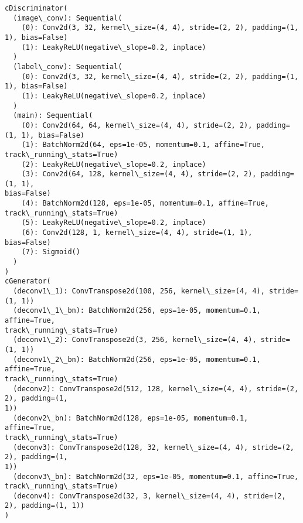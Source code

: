 \documentclass[11pt]{article}
\begin{document}
    \begin{Verbatim}[commandchars=\\\{\},fontsize=\footnotesize]
cDiscriminator(
  (image\_conv): Sequential(
    (0): Conv2d(3, 32, kernel\_size=(4, 4), stride=(2, 2), padding=(1, 1), bias=False)
    (1): LeakyReLU(negative\_slope=0.2, inplace)
  )
  (label\_conv): Sequential(
    (0): Conv2d(3, 32, kernel\_size=(4, 4), stride=(2, 2), padding=(1, 1), bias=False)
    (1): LeakyReLU(negative\_slope=0.2, inplace)
  )
  (main): Sequential(
    (0): Conv2d(64, 64, kernel\_size=(4, 4), stride=(2, 2), padding=(1, 1), bias=False)
    (1): BatchNorm2d(64, eps=1e-05, momentum=0.1, affine=True,
track\_running\_stats=True)
    (2): LeakyReLU(negative\_slope=0.2, inplace)
    (3): Conv2d(64, 128, kernel\_size=(4, 4), stride=(2, 2), padding=(1, 1),
bias=False)
    (4): BatchNorm2d(128, eps=1e-05, momentum=0.1, affine=True,
track\_running\_stats=True)
    (5): LeakyReLU(negative\_slope=0.2, inplace)
    (6): Conv2d(128, 1, kernel\_size=(4, 4), stride=(1, 1), bias=False)
    (7): Sigmoid()
  )
)
cGenerator(
  (deconv1\_1): ConvTranspose2d(100, 256, kernel\_size=(4, 4), stride=(1, 1))
  (deconv1\_1\_bn): BatchNorm2d(256, eps=1e-05, momentum=0.1, affine=True,
track\_running\_stats=True)
  (deconv1\_2): ConvTranspose2d(3, 256, kernel\_size=(4, 4), stride=(1, 1))
  (deconv1\_2\_bn): BatchNorm2d(256, eps=1e-05, momentum=0.1, affine=True,
track\_running\_stats=True)
  (deconv2): ConvTranspose2d(512, 128, kernel\_size=(4, 4), stride=(2, 2), padding=(1,
1))
  (deconv2\_bn): BatchNorm2d(128, eps=1e-05, momentum=0.1, affine=True,
track\_running\_stats=True)
  (deconv3): ConvTranspose2d(128, 32, kernel\_size=(4, 4), stride=(2, 2), padding=(1,
1))
  (deconv3\_bn): BatchNorm2d(32, eps=1e-05, momentum=0.1, affine=True,
track\_running\_stats=True)
  (deconv4): ConvTranspose2d(32, 3, kernel\_size=(4, 4), stride=(2, 2), padding=(1, 1))
)

    \end{Verbatim}
\end{document}
